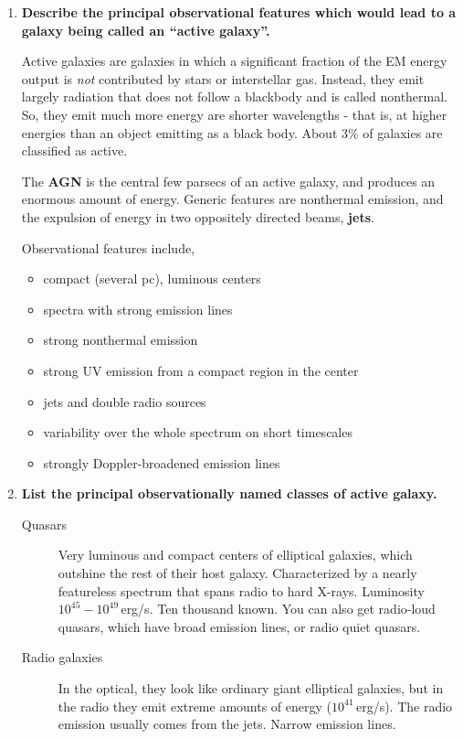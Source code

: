 \documentclass[a4paper]{article}
\begin{document}
\begin{enumerate}
\item \textbf{Describe the principal observational features which would lead to a galaxy being called an “active galaxy”.}

Active galaxies are galaxies in which a significant fraction of the EM energy output is \emph{not} contributed by stars or interstellar gas. Instead, they emit largely radiation that does not follow a blackbody and is called nonthermal. So, they emit much more energy are shorter wavelengths - that is, at higher energies than an object emitting as a black body. About 3\% of galaxies are classified as active. 

The \textbf{AGN} is the central few parsecs of an active galaxy, and produces an enormous amount of energy. Generic features are nonthermal emission, and the expulsion of energy in two oppositely directed beams, \textbf{jets}. 

Observational features include,

\begin{itemize}
\item compact (several pc), luminous centers
\item spectra with strong emission lines
\item strong nonthermal emission
\item strong UV emission from a compact region in the center
\item jets and double radio sources
\item variability over the whole spectrum on short timescales
\item strongly Doppler-broadened emission lines
\end{itemize}

\item \textbf{List the principal observationally named classes of active galaxy.}

\begin{description}

\item[Quasars] Very luminous and compact centers of elliptical galaxies, which outshine the rest of their host galaxy. Characterized by a nearly featureless spectrum that spans radio to hard X-rays. Luminosity $10^{45}-10^{49}$\,erg/s. Ten thousand known. You can also get radio-loud quasars, which have broad emission lines, or radio quiet quasars. 

\item[Radio galaxies] In the optical, they look like ordinary giant elliptical galaxies, but in the radio they emit extreme amounts of energy ($10^{41}$\,erg/s). The radio emission usually comes from the jets. Narrow emission lines. 


\end{description}
\end{enumerate}
\end{document}
